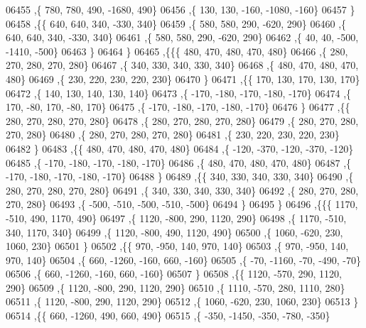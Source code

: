 \begin{DoxyCode}
06455     ,\{   780,   780,   490, -1680,   490\}
06456     ,\{   130,   130,  -160, -1080,  -160\}
06457     \}
06458    ,\{\{   640,   640,   340,  -330,   340\}
06459     ,\{   580,   580,   290,  -620,   290\}
06460     ,\{   640,   640,   340,  -330,   340\}
06461     ,\{   580,   580,   290,  -620,   290\}
06462     ,\{    40,    40,  -500, -1410,  -500\}
06463     \}
06464    \}
06465   ,\{\{\{   480,   470,   480,   470,   480\}
06466     ,\{   280,   270,   280,   270,   280\}
06467     ,\{   340,   330,   340,   330,   340\}
06468     ,\{   480,   470,   480,   470,   480\}
06469     ,\{   230,   220,   230,   220,   230\}
06470     \}
06471    ,\{\{   170,   130,   170,   130,   170\}
06472     ,\{   140,   130,   140,   130,   140\}
06473     ,\{  -170,  -180,  -170,  -180,  -170\}
06474     ,\{   170,   -80,   170,   -80,   170\}
06475     ,\{  -170,  -180,  -170,  -180,  -170\}
06476     \}
06477    ,\{\{   280,   270,   280,   270,   280\}
06478     ,\{   280,   270,   280,   270,   280\}
06479     ,\{   280,   270,   280,   270,   280\}
06480     ,\{   280,   270,   280,   270,   280\}
06481     ,\{   230,   220,   230,   220,   230\}
06482     \}
06483    ,\{\{   480,   470,   480,   470,   480\}
06484     ,\{  -120,  -370,  -120,  -370,  -120\}
06485     ,\{  -170,  -180,  -170,  -180,  -170\}
06486     ,\{   480,   470,   480,   470,   480\}
06487     ,\{  -170,  -180,  -170,  -180,  -170\}
06488     \}
06489    ,\{\{   340,   330,   340,   330,   340\}
06490     ,\{   280,   270,   280,   270,   280\}
06491     ,\{   340,   330,   340,   330,   340\}
06492     ,\{   280,   270,   280,   270,   280\}
06493     ,\{  -500,  -510,  -500,  -510,  -500\}
06494     \}
06495    \}
06496   ,\{\{\{  1170,  -510,   490,  1170,   490\}
06497     ,\{  1120,  -800,   290,  1120,   290\}
06498     ,\{  1170,  -510,   340,  1170,   340\}
06499     ,\{  1120,  -800,   490,  1120,   490\}
06500     ,\{  1060,  -620,   230,  1060,   230\}
06501     \}
06502    ,\{\{   970,  -950,   140,   970,   140\}
06503     ,\{   970,  -950,   140,   970,   140\}
06504     ,\{   660, -1260,  -160,   660,  -160\}
06505     ,\{   -70, -1160,   -70,  -490,   -70\}
06506     ,\{   660, -1260,  -160,   660,  -160\}
06507     \}
06508    ,\{\{  1120,  -570,   290,  1120,   290\}
06509     ,\{  1120,  -800,   290,  1120,   290\}
06510     ,\{  1110,  -570,   280,  1110,   280\}
06511     ,\{  1120,  -800,   290,  1120,   290\}
06512     ,\{  1060,  -620,   230,  1060,   230\}
06513     \}
06514    ,\{\{   660, -1260,   490,   660,   490\}
06515     ,\{  -350, -1450,  -350,  -780,  -350\}

\end{DoxyCode}
